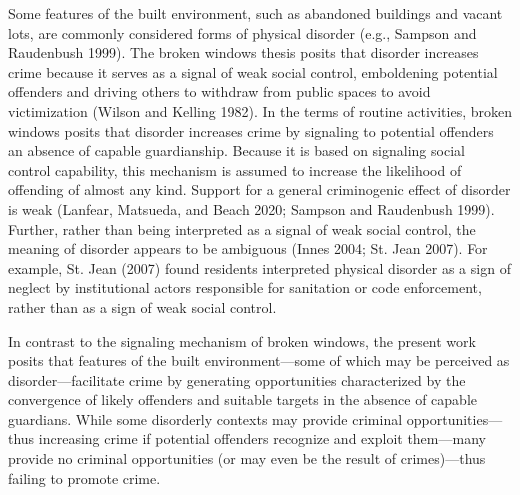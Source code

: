 \documentclass [11pt, proquest] {uwthesis}[2015/03/03]
\begin{document}
Some features of the built environment, such as abandoned buildings and vacant lots, are commonly considered forms of physical disorder (e.g., Sampson and Raudenbush 1999). The broken windows thesis posits that disorder increases crime because it serves as a signal of weak social control, emboldening potential offenders and driving others to withdraw from public spaces to avoid victimization (Wilson and Kelling 1982). In the terms of routine activities, broken windows posits that disorder increases crime by signaling to potential offenders an absence of capable guardianship. Because it is based on signaling social control capability, this mechanism is assumed to increase the likelihood of offending of almost any kind. Support for a general criminogenic effect of disorder is weak (Lanfear, Matsueda, and Beach 2020; Sampson and Raudenbush 1999). Further, rather than being interpreted as a signal of weak social control, the meaning of disorder appears to be ambiguous (Innes 2004; St. Jean 2007). For example, St. Jean (2007) found residents interpreted physical disorder as a sign of neglect by institutional actors responsible for sanitation or code enforcement, rather than as a sign of weak social control.

In contrast to the signaling mechanism of broken windows, the present work posits that features of the built environment---some of which may be perceived as disorder---facilitate crime by generating opportunities characterized by the convergence of likely offenders and suitable targets in the absence of capable guardians. While some disorderly contexts may provide criminal opportunities---thus increasing crime if potential offenders recognize and exploit them---many provide no criminal opportunities (or may even be the result of crimes)---thus failing to promote crime.
\end{document}
